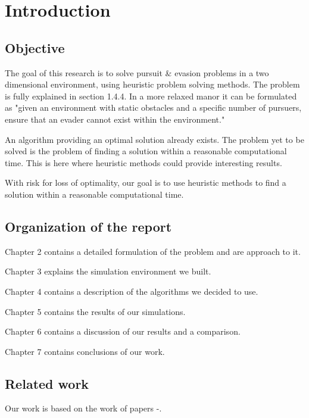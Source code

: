 \chapter{Introduction}

\section{Objective}

The goal of this research is to solve pursuit \& evasion problems in a two dimensional environment, using heuristic problem solving methods.
The problem is fully explained in section 1.4.4. In a more relaxed manor it can be formulated as "given an environment with static obstacles and a specific number of pursuers, ensure that an evader cannot exist within the environment."

An algorithm providing an optimal solution already exists.
The problem yet to be solved is the problem of finding a solution within a reasonable computational time. This is here where heuristic methods could provide interesting results.

With risk for loss of optimality, our goal is to use heuristic methods to find a solution within a reasonable computational time.
 
\section{Organization of the report}
\begin{description}
\item Chapter 2 contains a detailed formulation of the problem and are approach to it.
\item Chapter 3 explains the simulation environment we built.
\item Chapter 4 contains a description of the algorithms we decided to use.
\item Chapter 5 contains the results of our simulations.
\item Chapter 6 contains a discussion of our results and a comparison.
\item Chapter 7 contains conclusions of our work.
\end{description}

\section{Related work}

Our work is based on the work of papers \cite{paper1}-\cite{paper3}.

